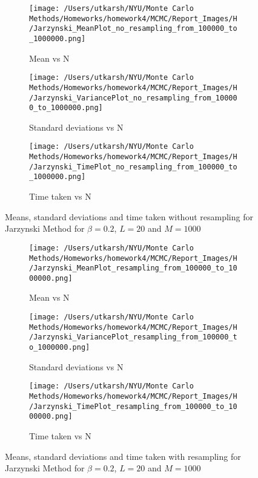 \documentclass[11pt]{article}
\begin{document}
\begin{figure}[H]
	\centering
	\begin{subfigure}{.30\textwidth}
		\texttt{[image: /Users/utkarsh/NYU/Monte Carlo Methods/Homeworks/homework4/MCMC/Report\_Images/H/Jarzynski\_MeanPlot\_no\_resampling\_from\_100000\_to\_1000000.png]}
		\caption{Mean vs N}
	\end{subfigure}
	\begin{subfigure}{.30\textwidth}
		\texttt{[image: /Users/utkarsh/NYU/Monte Carlo Methods/Homeworks/homework4/MCMC/Report\_Images/H/Jarzynski\_VariancePlot\_no\_resampling\_from\_100000\_to\_1000000.png]}
		\caption{Standard deviations vs N}
	\end{subfigure}
	\begin{subfigure}{.30\textwidth}
		\texttt{[image: /Users/utkarsh/NYU/Monte Carlo Methods/Homeworks/homework4/MCMC/Report\_Images/H/Jarzynski\_TimePlot\_no\_resampling\_from\_100000\_to\_1000000.png]}
		\caption{Time taken vs N}
	\end{subfigure}	
    \caption{Means, standard deviations and time taken without resampling for Jarzynski Method for $\beta = 0.2$, $L = 20$ and $M = 1000$}
	\label{fig:jarzynski_no_resampling}
\end{figure}


\begin{figure}[H]
	\centering
	\begin{subfigure}{.30\textwidth}
		\texttt{[image: /Users/utkarsh/NYU/Monte Carlo Methods/Homeworks/homework4/MCMC/Report\_Images/H/Jarzynski\_MeanPlot\_resampling\_from\_100000\_to\_1000000.png]}
		\caption{Mean vs N}
	\end{subfigure}
	\begin{subfigure}{.30\textwidth}
		\texttt{[image: /Users/utkarsh/NYU/Monte Carlo Methods/Homeworks/homework4/MCMC/Report\_Images/H/Jarzynski\_VariancePlot\_resampling\_from\_100000\_to\_1000000.png]}
		\caption{Standard deviations vs N}
	\end{subfigure}
	\begin{subfigure}{.30\textwidth}
		\texttt{[image: /Users/utkarsh/NYU/Monte Carlo Methods/Homeworks/homework4/MCMC/Report\_Images/H/Jarzynski\_TimePlot\_resampling\_from\_100000\_to\_1000000.png]}
		\caption{Time taken vs N}
	\end{subfigure}	
    \caption{Means, standard deviations and time taken with resampling for Jarzynski Method for $\beta = 0.2$, $L = 20$ and $M = 1000$}
	\label{fig:jarzynski_resampling}
\end{figure}
\end{document}
